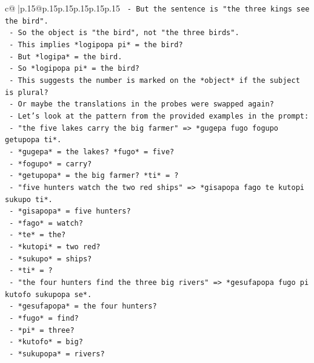 \documentclass{article}
\begin{document}
{\begin{supertabular}{c@{$\;$}|p{.15\linewidth}@{}p{.15\linewidth}p{.15\linewidth}p{.15\linewidth}p{.15\linewidth}p{.15\linewidth}}
{{{\texttt{        {-} But the sentence is "the three kings see the bird".} \\
\texttt{        {-} So the object is "the bird", not "the three birds".} \\
\texttt{        {-} This implies *logipopa pi* = the bird?} \\
\texttt{        {-} But *logipa* = the bird.} \\
\texttt{        {-} So *logipopa pi* = the bird?} \\
\texttt{        {-} This suggests the number is marked on the *object* if the subject is plural?} \\
\texttt{        {-} Or maybe the translations in the probes were swapped again?} \\
\texttt{        {-} Let's look at the pattern from the provided examples in the prompt:} \\
\texttt{          {-} "the five lakes carry the big farmer" => *gugepa fugo fogupo getupopa ti*.} \\
\texttt{            {-} *gugepa* = the lakes? *fugo* = five?} \\
\texttt{            {-} *fogupo* = carry?} \\
\texttt{            {-} *getupopa* = the big farmer? *ti* = ?} \\
\texttt{          {-} "five hunters watch the two red ships" => *gisapopa fago te kutopi sukupo ti*.} \\
\texttt{            {-} *gisapopa* = five hunters?} \\
\texttt{            {-} *fago* = watch?} \\
\texttt{            {-} *te* = the?} \\
\texttt{            {-} *kutopi* = two red?} \\
\texttt{            {-} *sukupo* = ships?} \\
\texttt{            {-} *ti* = ?} \\
\texttt{          {-} "the four hunters find the three big rivers" => *gesufapopa fugo pi kutofo sukupopa se*.} \\
\texttt{            {-} *gesufapopa* = the four hunters?} \\
\texttt{            {-} *fugo* = find?} \\
\texttt{            {-} *pi* = three?} \\
\texttt{            {-} *kutofo* = big?} \\
\texttt{            {-} *sukupopa* = rivers?} \\
}}}
\end{supertabular}}
\end{document}

